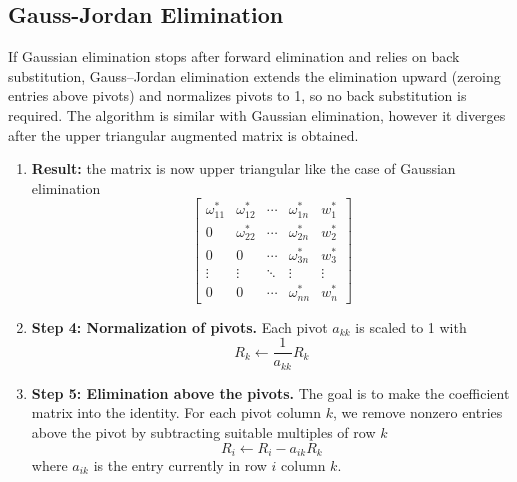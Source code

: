 \documentclass[../../../main.tex]{subfiles}
\begin{document}
\subsection{Gauss-Jordan Elimination}
If Gaussian elimination stops after forward elimination and relies on back substitution, Gauss–Jordan elimination extends the elimination upward (zeroing entries above pivots) and normalizes pivots to 1, so no back substitution is required.
The algorithm is similar with Gaussian elimination, however it diverges after the upper triangular augmented  matrix is obtained.
\begin{enumerate}
    \item \textbf{Result:} the matrix is now upper triangular like the case of Gaussian elimination
          \[
              \begin{bmatrix}
                  \omega_{11}^{*} & \omega_{12}^{*} & \cdots & \omega_{1n}^{*} & w_1^{*} \\
                  0               & \omega_{22}^{*} & \cdots & \omega_{2n}^{*} & w_2^{*} \\
                  0               & 0               & \cdots & \omega_{3n}^{*} & w_3^{*} \\
                  \vdots          & \vdots          & \ddots & \vdots          & \vdots  \\
                  0               & 0               & \cdots & \omega_{nn}^{*} & w_n^{*}
              \end{bmatrix}
          \]
    \item \textbf{Step 4: Normalization of pivots.}
    Each pivot $a_{kk}$ is scaled to 1 with 
    \begin{equation*}
        R_k \leftarrow \frac{1 }{a_{kk}}R_k 
    \end{equation*}
    \item \textbf{Step 5: Elimination above the pivots.}
    The goal is to make the coefficient matrix into the identity.
    For each pivot column $k$, we remove nonzero entries above the pivot by subtracting suitable multiples of row $k$
    \begin{equation*}
        R_i \leftarrow R_i -a_{ik}R_k
    \end{equation*}
    where $a_{ik}$ is the entry currently in row $i$ column $k$.
\end{enumerate}
\end{document}
